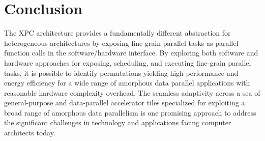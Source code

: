 
\section{Conclusion}
\label{sec-conclusion}

The XPC architecture provides a fundamentally different abstraction for
heterogeneous architectures by exposing fine-grain parallel tasks as
parallel function calls in the software/hardware interface. By exploring
both software and hardware approaches for exposing, scheduling, and
executing fine-grain parallel tasks, it is possible to identify
permutations yielding high performance and energy efficiency for a wide
range of amorphous data parallel applications with reasonable hardware
complexity overhead. The seamless adaptivity across a sea of
general-purpose and data-parallel accelerator tiles specialized for
exploiting a broad range of amorphous data parallelism is one promising
approach to address the significant challenges in technology and
applications facing computer architects today.
